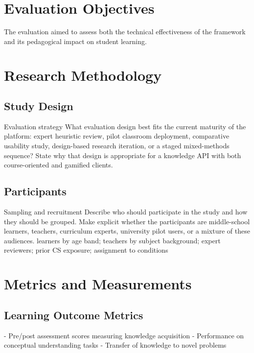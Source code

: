 \section{Evaluation Objectives}

The evaluation aimed to assess both the technical effectiveness of the framework and its pedagogical impact on student learning.

\section{Research Methodology}

\subsection{Study Design}

\OpenQuestionPrompt
  {Evaluation strategy}
  {What evaluation design best fits the current maturity of the platform: expert heuristic review, pilot classroom deployment, comparative usability study, design-based research iteration, or a staged mixed-methods sequence? State why that design is appropriate for a knowledge API with both course-oriented and gamified clients.}

\subsection{Participants}

\CategoryPrompt
  {Sampling and recruitment}
  {Describe who should participate in the study and how they should be grouped. Make explicit whether the participants are middle-school learners, teachers, curriculum experts, university pilot users, or a mixture of these audiences.}
  {learners by age band; teachers by subject background; expert reviewers; prior CS exposure; assignment to conditions}

\section{Metrics and Measurements}

\subsection{Learning Outcome Metrics}

- Pre/post assessment scores measuring knowledge acquisition
- Performance on conceptual understanding tasks
- Transfer of knowledge to novel problems

